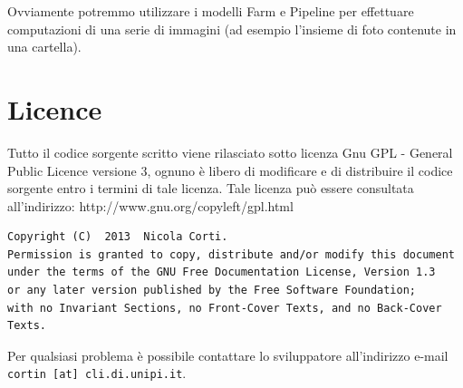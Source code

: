 \documentclass[a4paper,10pt]{article}
\begin{document}
Ovviamente potremmo utilizzare i modelli \textsf{Farm} e \textsf{Pipeline} per effettuare computazioni di una serie di immagini (ad esempio l'insieme di foto contenute in una cartella).




\section{Licence}
\small{
Tutto il codice sorgente scritto viene rilasciato sotto licenza Gnu GPL - General Public Licence versione 3, ognuno \`e libero di modificare e di distribuire il codice sorgente entro i termini di tale licenza.
Tale licenza pu\`o essere consultata all'indirizzo: http://www.gnu.org/copyleft/gpl.html

\begin{verbatim}
Copyright (C)  2013  Nicola Corti.
Permission is granted to copy, distribute and/or modify this document
under the terms of the GNU Free Documentation License, Version 1.3
or any later version published by the Free Software Foundation;
with no Invariant Sections, no Front-Cover Texts, and no Back-Cover Texts.
\end{verbatim}
Per qualsiasi problema \`e possibile contattare lo sviluppatore all'indirizzo e-mail \texttt{cortin [at] cli.di.unipi.it}.
}
\end{document}
